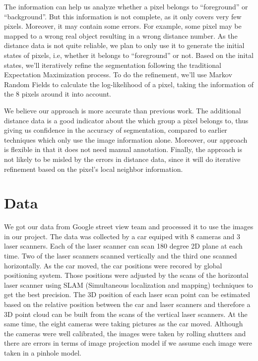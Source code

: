 \documentclass{article} %
\begin{document}
The information can help us analyze whether a pixel belongs to ``foreground'' 
or ``background''. But this information is not complete, as it only covers 
very few pixels. Moreover, it may contain some errors. For example, some pixel
may be mapped to a wrong real object resulting in a wrong distance number.
As the distance data is not quite reliable, we plan to only use it to generate 
the initial states of pixels, i.e, whether it belongs to ``foreground'' or not.
Based on the inital states, we'll iteratively refine the segmentation following 
the traditional Expectation Maximization process. To do the refinement, we'll 
use Markov Random Fields to calculate the log-likelihood of a pixel, taking the
information of the 8 pixels around it into account.

We believe our approach is more accurate than previous work. The additional 
distance data is a good indicator about the which group a pixel belongs to, 
thus giving us confidence in the accuracy of segmentation, compared to earlier
 techniques which only use the image information alone. Moreover, our approach is 
flexible in that it does not need manual annotation. Finally, the approach
is not likely to be misled by the errors in distance data, since it will do 
iterative refinement based on the pixel's local neighbor information.



\section{Data}
We got our data from Google street view team and processed it to use
the images in our project. The data was collected by a car equiped
with 8 cameras and 3 laser scanners. Each of the laser scanner can scan 180 degree 2D
plane at each time. Two of the laser scanners scanned vertically and
the third one scanned horizontally. As the car moved, the car
positions were recored by global positioning system. Those positions
were adjusted by the scans of the horizontal laser scanner using SLAM
(Simultaneous localization and mapping) techniques to get the best
precision. The 3D position of each laser scan point can be
estimated based on the relative position between the car and laser
scanners and therefore a 3D point cloud can be built from the scans of
the vertical laser scanners. At the same time, the eight
cameras were taking pictures as the car moved. Although the cameras
were well calibrated, the images were taken by rolling shutters and
there are errors in terms of image projection model if we assume each
image were taken in a pinhole model.
\end{document}
